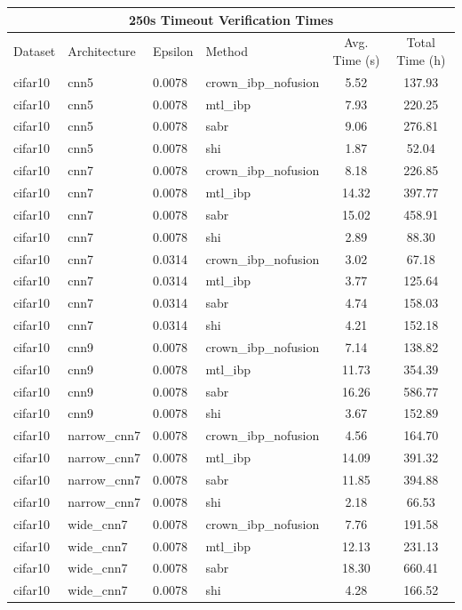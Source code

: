 \begin{tabular}{llllcc}
\toprule
\multicolumn{6}{c}{250s Timeout Verification Times} \\
\midrule
Dataset & Architecture & Epsilon & Method & Avg. Time (s) & Total Time (h) \\
\midrule
cifar10 & cnn5 & 0.0078 & crown\_ibp\_nofusion & 5.52 & 137.93 \\
cifar10 & cnn5 & 0.0078 & mtl\_ibp & 7.93 & 220.25 \\
cifar10 & cnn5 & 0.0078 & sabr & 9.06 & 276.81 \\
cifar10 & cnn5 & 0.0078 & shi & 1.87 & 52.04 \\
cifar10 & cnn7 & 0.0078 & crown\_ibp\_nofusion & 8.18 & 226.85 \\
cifar10 & cnn7 & 0.0078 & mtl\_ibp & 14.32 & 397.77 \\
cifar10 & cnn7 & 0.0078 & sabr & 15.02 & 458.91 \\
cifar10 & cnn7 & 0.0078 & shi & 2.89 & 88.30 \\
cifar10 & cnn7 & 0.0314 & crown\_ibp\_nofusion & 3.02 & 67.18 \\
cifar10 & cnn7 & 0.0314 & mtl\_ibp & 3.77 & 125.64 \\
cifar10 & cnn7 & 0.0314 & sabr & 4.74 & 158.03 \\
cifar10 & cnn7 & 0.0314 & shi & 4.21 & 152.18 \\
cifar10 & cnn9 & 0.0078 & crown\_ibp\_nofusion & 7.14 & 138.82 \\
cifar10 & cnn9 & 0.0078 & mtl\_ibp & 11.73 & 354.39 \\
cifar10 & cnn9 & 0.0078 & sabr & 16.26 & 586.77 \\
cifar10 & cnn9 & 0.0078 & shi & 3.67 & 152.89 \\
cifar10 & narrow\_cnn7 & 0.0078 & crown\_ibp\_nofusion & 4.56 & 164.70 \\
cifar10 & narrow\_cnn7 & 0.0078 & mtl\_ibp & 14.09 & 391.32 \\
cifar10 & narrow\_cnn7 & 0.0078 & sabr & 11.85 & 394.88 \\
cifar10 & narrow\_cnn7 & 0.0078 & shi & 2.18 & 66.53 \\
cifar10 & wide\_cnn7 & 0.0078 & crown\_ibp\_nofusion & 7.76 & 191.58 \\
cifar10 & wide\_cnn7 & 0.0078 & mtl\_ibp & 12.13 & 231.13 \\
cifar10 & wide\_cnn7 & 0.0078 & sabr & 18.30 & 660.41 \\
cifar10 & wide\_cnn7 & 0.0078 & shi & 4.28 & 166.52 \\

\end{tabular}
